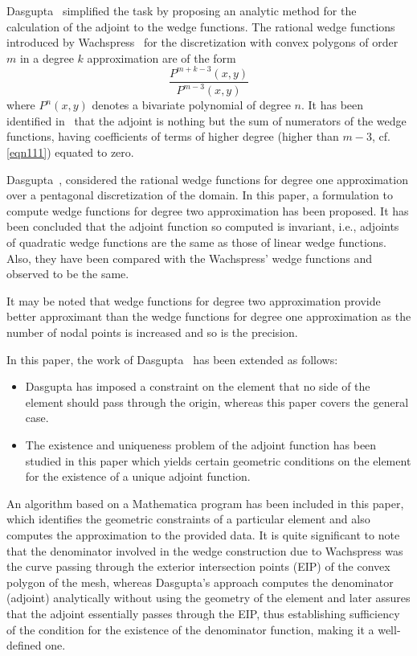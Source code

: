 Dasgupta~\cite{das} simplified the task by proposing an analytic method for the
calculation of the adjoint to the wedge functions. The rational wedge functions
introduced by Wachspress~\cite{wachs} for the discretization with convex
polygons of order $m$ in a degree $k$ approximation are of the form
\begin{equation}
  \frac{P^{m+k-3}(x,y)}{P^{m-3}(x,y)} \label{eqn111}
\end{equation}
where $P^n(x,y)$ denotes a bivariate polynomial of degree  $n$. It has been
identified in~\cite{das} that the adjoint is nothing but the sum of numerators
of the wedge functions, having coefficients of terms of higher degree (higher
than $m-3$, cf. \autoref{eqn111}) equated to zero.

Dasgupta~\cite{das}, considered the rational wedge functions for degree one
approximation over a pentagonal discretization of the domain. In this paper, a
formulation to compute wedge functions for degree two approximation has been
proposed. It has been concluded that the adjoint function so computed is
invariant, i.e., adjoints of quadratic wedge functions are the same as those of
linear wedge functions. Also, they have been compared with the Wachspress\rq{}
wedge functions and observed to be the same.

It may be noted that wedge functions for degree two approximation provide better
approximant than the wedge functions for degree one approximation as the number
of nodal points is increased and so is the precision.

In this paper, the work of Dasgupta~\cite{das} has been extended as follows:
\begin{itemize}
  \item Dasgupta has imposed a constraint on the element that no side of
        the element should pass through the origin, whereas this paper covers the
        general case.
  \item The existence and uniqueness problem of the adjoint function has
        been studied in this paper which yields certain geometric conditions on the
        element for the existence of a unique adjoint function.
\end{itemize}

An algorithm based on a Mathematica program has been included in this paper,
which identifies the geometric constraints of a particular element and also
computes the approximation to the provided data. It is quite significant to note
that the denominator involved in the wedge construction due to Wachspress was
the curve passing through the exterior intersection points (EIP) of the convex
polygon of the mesh, whereas Dasgupta's approach computes the denominator
(adjoint) analytically without using the geometry of the element and later
assures that the adjoint essentially passes through the EIP, thus establishing
sufficiency of the condition for the existence of the denominator function,
making it a well-defined one.

